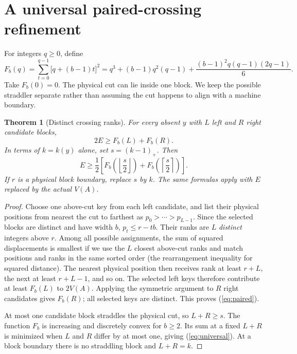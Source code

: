 \documentclass[10pt,letterpaper]{article}
\newtheorem{theorem}{Theorem}
\begin{document}
\section{A universal paired-crossing refinement}
For integers $q\ge0$, define
\begin{equation}\label{eq:F}
F_b(q)=\sum_{t=0}^{q-1}\bigl[q+(b-1)t\bigr]^2
=q^3+(b-1)q^2(q-1)+\frac{(b-1)^2q(q-1)(2q-1)}6.
\end{equation}
Take $F_b(0)=0$. The physical cut can lie inside one block. We keep the possible straddler separate rather than assuming the cut happens to align with a machine boundary.
\begin{theorem}[Distinct crossing ranks]\label{thm:paired}
 For every absent $y$ with $L$ left and $R$ right candidate blocks,
 \begin{equation}\label{eq:paired}
 2E\ge F_b(L)+F_b(R).
 \end{equation}
 In terms of $k=k(y)$ alone, set $s=(k-1)_+$. Then
 \begin{equation}\label{eq:universal}
 E\ge \frac12\left[F_b\!\left(\left\lfloor\frac{s}{2}\right\rfloor\right)
 +F_b\!\left(\left\lceil\frac{s}{2}\right\rceil\right)\right].
 \end{equation}
 If $r$ is a physical block boundary, replace $s$ by $k$. The same formulas apply with $E$ replaced by the actual $V(A)$.
\end{theorem}
\begin{proof}
Choose one above-cut key from each left candidate, and list their physical positions from nearest the cut to farthest as $p_0>\cdots>p_{L-1}$. Since the selected blocks are distinct and have width $b$, $p_t\le r-tb$. Their ranks are $L$ \emph{distinct} integers above $r$. Among all possible assignments, the sum of squared displacements is smallest if we use the $L$ closest above-cut ranks and match positions and ranks in the same sorted order (the rearrangement inequality for squared distance). The nearest physical position then receives rank at least $r+L$, the next at least $r+L-1$, and so on. The selected left keys therefore contribute at least $F_b(L)$ to $2V(A)$. Applying the symmetric argument to $R$ right candidates gives $F_b(R)$; all selected keys are distinct. This proves (\ref{eq:paired}).

At most one candidate block straddles the physical cut, so $L+R\ge s$. The function $F_b$ is increasing and discretely convex for $b\ge2$. Its sum at a fixed $L+R$ is minimized when $L$ and $R$ differ by at most one, giving (\ref{eq:universal}). At a block boundary there is no straddling block and $L+R=k$.
\end{proof}
\end{document}

